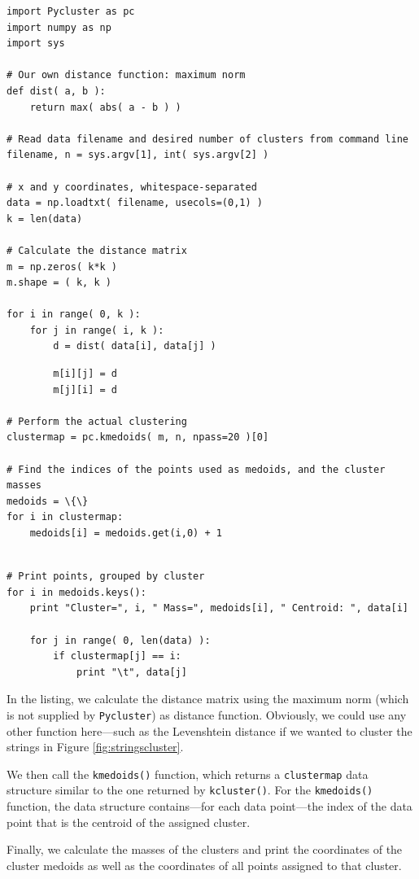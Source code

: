 \begin{verbatim}
import Pycluster as pc
import numpy as np
import sys

# Our own distance function: maximum norm
def dist( a, b ):
    return max( abs( a - b ) )

# Read data filename and desired number of clusters from command line
filename, n = sys.argv[1], int( sys.argv[2] )

# x and y coordinates, whitespace-separated
data = np.loadtxt( filename, usecols=(0,1) )
k = len(data)

# Calculate the distance matrix
m = np.zeros( k*k )
m.shape = ( k, k )

for i in range( 0, k ):
    for j in range( i, k ):
        d = dist( data[i], data[j] )
\end{verbatim}
\begin{verbatim}
        m[i][j] = d
        m[j][i] = d

# Perform the actual clustering
clustermap = pc.kmedoids( m, n, npass=20 )[0]

# Find the indices of the points used as medoids, and the cluster masses
medoids = \{\}
for i in clustermap:
    medoids[i] = medoids.get(i,0) + 1
\end{verbatim}
\begin{verbatim}

# Print points, grouped by cluster
for i in medoids.keys():
    print "Cluster=", i, " Mass=", medoids[i], " Centroid: ", data[i]

    for j in range( 0, len(data) ):
        if clustermap[j] == i:
            print "\t", data[j]
\end{verbatim}

In the listing, we calculate the distance matrix using the maximum
norm (which is not supplied by \texttt{Pycluster}) as distance
function. Obviously, we could use any other function here---such as
the Levenshtein distance if we wanted to cluster the strings in Figure
\ref{fig:stringscluster}.

We then call the \texttt{kmedoids()} function,  which returns a
\texttt{clustermap} data structure similar to the one returned by
\texttt{kcluster()}. For the \texttt{kmedoids()} function, the data
structure contains---for each data point---the index of the data point
that is the centroid of the assigned cluster.

Finally, we calculate the masses of the clusters and print the
coordinates of the cluster medoids as well as the coordinates of all
points assigned to that cluster.

